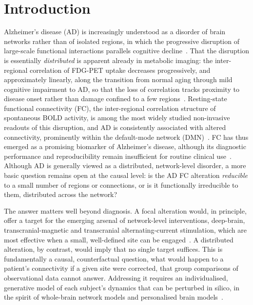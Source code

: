\documentclass[11pt]{article}
\begin{document}
\section*{Introduction}
Alzheimer's disease (AD) is increasingly understood as a disorder of brain
networks rather than of isolated regions, in which the progressive disruption of
large-scale functional interactions parallels cognitive decline~\cite{seeley2009,delbeuck2003}.
That the disruption is essentially \emph{distributed} is apparent already in
metabolic imaging: the inter-regional correlation of FDG-PET uptake decreases
progressively, and approximately linearly, along the transition from normal
aging through mild cognitive impairment to AD, so that the loss of correlation
tracks proximity to disease onset rather than damage confined to a few
regions~\cite{pagani2016,pagani2017}.
Resting-state functional connectivity (FC), the inter-regional correlation
structure of spontaneous BOLD activity, is
among the most widely studied non-invasive readouts of this disruption, and AD
is consistently associated with altered connectivity, prominently within the
default-mode network (DMN)~\cite{greicius2004,sheline2013}. FC has thus emerged as a
promising biomarker of Alzheimer's disease, although its diagnostic performance
and reproducibility remain insufficient for routine clinical
use~\cite{buckner2013}. Although AD is generally
viewed as a distributed, network-level disorder, a more basic question remains
open at the causal level: is the AD FC alteration \emph{reducible} to a small
number of regions or connections, or is it functionally irreducible to them,
distributed across the network?

The answer matters well beyond diagnosis. A focal alteration would, in
principle, offer a target for the emerging arsenal of network-level
interventions, deep-brain, transcranial-magnetic and transcranial
alternating-current stimulation, which are most effective when a small,
well-defined site can be engaged~\cite{fox2014}. A
distributed alteration, by contrast, would imply that no single target suffices.
This is fundamentally a causal, counterfactual question, what would happen to a
patient's connectivity if a given site were corrected, that group comparisons
of observational data cannot answer. Addressing it requires an individualised,
generative model of each subject's dynamics that can be perturbed in silico, in
the spirit of whole-brain network models and personalised brain
models~\cite{honey2009,deco2011,sanzleon2013,jirsa2017,wang2019}.
\end{document}
